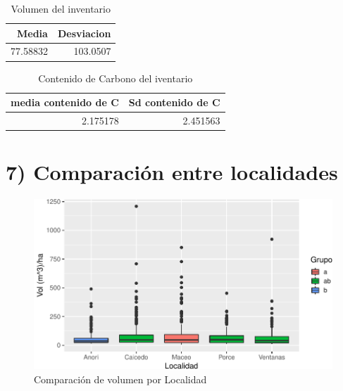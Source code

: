\documentclass[9pt,onecolumn,twoside,]{pinp}
\begin{document}
\begin{table}

\caption{\label{tab:unnamed-chunk-29}Volumen del inventario}
\centering
\begin{tabular}[t]{r|r}
\hline
Media & Desviacion\\
\hline
77.58832 & 103.0507\\
\hline
\end{tabular}
\end{table}

\begin{table}

\caption{\label{tab:unnamed-chunk-30}Contenido de Carbono del iventario}
\centering
\begin{tabular}[t]{r|r}
\hline
media contenido de C & Sd contenido de C\\
\hline
2.175178 & 2.451563\\
\hline
\end{tabular}
\end{table}

\hypertarget{comparaciuxf3n-entre-localidades}{%
\section{7) Comparación entre
localidades}\label{comparaciuxf3n-entre-localidades}}

\begin{figure}

{\centering \includegraphics{David_Londono_Lopera_Cristian_Ganan_parcial3_files/figure-latex/unnamed-chunk-31-1} 

}

\caption{Comparación de volumen por Localidad}\label{fig:unnamed-chunk-31}
\end{figure}
\end{document}
